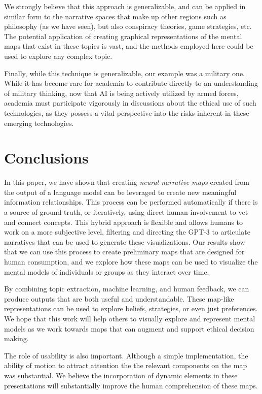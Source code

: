 \documentclass[11pt,dvipdfm]{article}
\begin{document}
We strongly believe that this approach is generalizable, and can be applied in similar form to the narrative spaces that make up other regions such as philosophy (as we have seen), but also conspiracy theories, game strategies, etc. The potential application of creating graphical representations of the mental maps that exist in these topics is vast, and the methods employed here could be used to explore any complex topic.

Finally, while this technique is generalizable, our example was a military one. While it has become rare for academia to contribute directly to an understanding of military thinking, now that AI is being actively utilized by armed forces, academia must participate vigorously in discussions about the ethical use of such technologies, as they possess a vital perspective into the risks inherent in these emerging technologies.


\section{Conclusions}
In this paper, we have shown that creating \textit{neural narrative maps} created from the output of a language model can be leveraged to create new meaningful information relationships. This process can be performed automatically if there is a source of ground truth, or iteratively, using direct human involvement to vet and connect concepts. This hybrid approach is flexible and allows humans to work on a more subjective level, filtering and directing the GPT-3 to articulate narratives that can be used to generate these visualizations. Our results show that we can use this process to create preliminary maps that are designed for human consumption, and we explore how these maps can be used to visualize the mental models of individuals or groups as they interact over time.

By combining topic extraction, machine learning, and human feedback, we can produce outputs that are both useful and understandable. These map-like representations can be used to explore beliefs, strategies, or even just preferences. We hope that this work will help others to visually explore and represent mental models as we work towards maps that can augment and support ethical decision making.

The role of usability is also important. Although a simple implementation, the ability of motion to attract attention the the relevant components on the map was substantial. We believe the incorporation of dynamic elements in these presentations will substantially improve the human comprehension of these maps.
\end{document}
